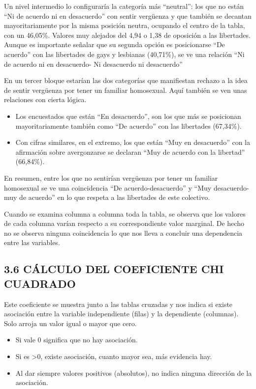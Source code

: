\documentclass[
  12 pt,
  a4paper,
]{article}
\providecommand{\tightlist}{%
  \setlength{\itemsep}{0pt}\setlength{\parskip}{0pt}}
\begin{document}
Un nivel intermedio lo configuraría la categoría más ``neutral'': los
que no están ``Ni de acuerdo ni en desacuerdo'' con sentir vergüenza y
que también se decantan mayoritariamente por la misma posición neutra,
ocupando el centro de la tabla, con un 46,05\%. Valores muy alejados del
4,94 o 1,38 de oposición a las libertades. Aunque es importante señalar
que su segunda opción es posicionarse ``De acuerdo'' con las libertades
de gays y lesbianas (40,71\%), se ve una relación ``Ni de acuerdo ni en
desacuerdo- Ni desacuerdo ni desacuerdo''

En un tercer bloque estarían las dos categorías que manifiestan rechazo
a la idea de sentir vergüenza por tener un familiar homosexual. Aquí
también se ven unas relaciones con cierta lógica.

\begin{itemize}
\item
  Los encuestados que están ``En desacuerdo'', son los que más se
  posicionan mayoritariamente también como ``De acuerdo'' con las
  libertades (67,34\%).
\item
  Con cifras similares, en el extremo, los que están ``Muy en
  desacuerdo'' con la afirmación sobre avergonzarse se declaran ``Muy de
  acuerdo con la libertad'' (66,84\%).
\end{itemize}

En resumen, entre los que no sentirían vergüenza por tener un familiar
homosexual se ve una coincidencia ``De acuerdo-desacuerdo'' y ``Muy
desacuerdo-muy de acuerdo'' en lo que respeta a las libertades de este
colectivo.

Cuando se examina columna a columna toda la tabla, se observa que los
valores de cada columna varían respecto a su correspondiente valor
marginal. De hecho no se observa ninguna coincidencia lo que nos lleva a
concluir una dependencia entre las variables.

\subsection{3.6 CÁLCULO DEL COEFICIENTE CHI
CUADRADO}\label{cuxe1lculo-del-coeficiente-chi-cuadrado}

Este coeficiente se muestra junto a las tablas cruzadas y nos indica si
existe asociación entre la variable independiente (filas) y la
dependiente (columnas). Solo arroja un valor igual o mayor que cero.

\begin{itemize}
\tightlist
\item
  Si vale 0 significa que no hay asociación.
\item
  Si es \textgreater0, existe asociación, cuanto mayor sea, más
  evidencia hay.
\item
  Al dar siempre valores positivos (absolutos), no indica ninguna
  dirección de la asociación.
\end{itemize}
\end{document}
